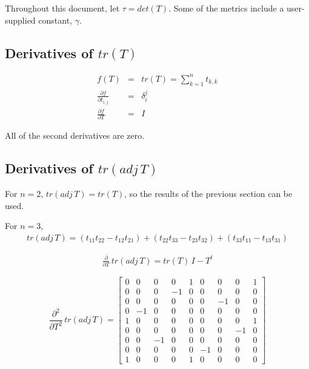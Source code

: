 \documentclass{report}
\begin{document}
\noindent Throughout this document, let $\tau = det(T)$. Some of the 
metrics include a user-supplied constant, $\gamma$. \newline

\subsection{Derivatives of $tr(T)$}

\begin{eqnarray}
f(T) & = & tr(T) = \sum_{k=1}^n t_{k,k} \\
\frac{\partial f}{\partial t_{i,j}} &=& \delta_i^j \\
\frac{\partial f}{\partial T} &=& I 
\end{eqnarray}

\noindent All of the second derivatives are zero. \newline

\subsection{Derivatives of $tr(adj \, T)$ \label{traj}}

\noindent For $n=2$, $tr(adj \, T) = tr(T)$, so the results of 
the previous section can be used. \newline

\noindent For $n=3$, 
\begin{eqnarray}
tr( adj \, T ) = (t_{11} t_{22} - t_{12} t_{21})+ (t_{22} t_{33} - t_{23} t_{32})+ (t_{33} t_{11} - t_{13} t_{31})
\end{eqnarray}

\begin{eqnarray}
\frac{\partial}{\partial T} \, tr(adj \, T) = tr(T) \, I - T^t
\end{eqnarray}

\begin{equation}
\label{tradj2}
\frac{\partial^2}{\partial T^2} \, tr(adj \, T) =
\left[ \begin{array}{ccccccccc}
 0 & 0 & 0 & 0 & 1 & 0 & 0 & 0 & 1 \\
 0 & 0 & 0 & -1 & 0 & 0 & 0 & 0 & 0 \\
 0 & 0 & 0 & 0 & 0 & 0 & -1 & 0 & 0 \\
 0 & -1 & 0 & 0 & 0 & 0 & 0 & 0 & 0 \\
 1 & 0 & 0 & 0 & 0 & 0 & 0 & 0 & 1 \\
 0 & 0 & 0 & 0 & 0 & 0 & 0 & -1 & 0 \\
 0 & 0 & -1 & 0 & 0 & 0 & 0 & 0 & 0 \\
 0 & 0 & 0 & 0 & 0 & -1 & 0 & 0 & 0 \\
 1 & 0 & 0 & 0 & 1 & 0 & 0 & 0 & 0
\end{array} \right]
\end{equation}
\end{document}
